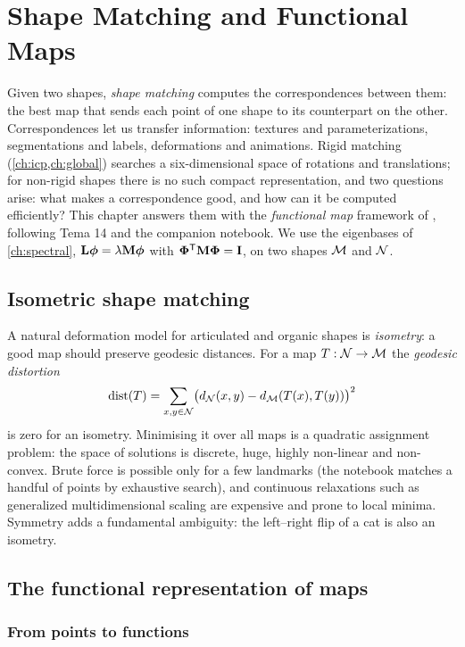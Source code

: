 \chapter{Shape Matching and Functional Maps}\label{ch:fmaps}

Given two shapes, \emph{shape matching} computes the correspondences between them: the best map
that sends each point of one shape to its counterpart on the other. Correspondences let us
transfer information: textures and parameterizations, segmentations and labels, deformations and
animations. Rigid matching (\cref{ch:icp,ch:global}) searches a six-dimensional space of rotations
and translations; for non-rigid shapes there is no such compact representation, and two questions
arise: what makes a correspondence good, and how can it be computed efficiently? This chapter
answers them with the \emph{functional map} framework of \citet{Ovsjanikov2012}, following Tema 14 and
the companion notebook. We use the eigenbases of \cref{ch:spectral}, $\mathbf{L}\boldsymbol{\phi}=\lambda\mathbf{M}\boldsymbol{\phi}$ with
$\boldsymbol{\Phi}^{\mathsf{T}}\mathbf{M}\boldsymbol{\Phi}=\mathbf{I}$, on two shapes $\mathcal{M}$ and $\mathcal{N}$.

\section{Isometric shape matching}

A natural deformation model for articulated and organic shapes is \emph{isometry}: a good map should
preserve geodesic distances. For a map $T:\mathcal{N}\to\mathcal{M}$ the \emph{geodesic distortion}
\begin{equation}
\mathrm{dist}(T)=\sum_{x,y\in\mathcal{N}}\bigl(d_{\mathcal{N}}(x,y)-d_{\mathcal{M}}(T(x),T(y))\bigr)^2
\end{equation}
is zero for an isometry. Minimising it over all maps is a quadratic assignment problem: the space of
solutions is discrete, huge, highly non-linear and non-convex. Brute force is possible only for a few
landmarks (the notebook matches a handful of points by exhaustive search), and continuous
relaxations such as generalized multidimensional scaling \citep{Bronstein2006} are expensive and
prone to local minima. Symmetry adds a fundamental ambiguity: the left--right flip of a cat is also an
isometry.

\section{The functional representation of maps}

\subsection{From points to functions}

